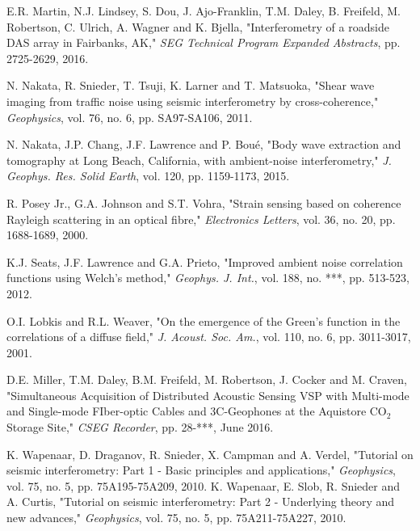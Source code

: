 \documentclass[11pt]{article}
\begin{document}
\begin{thebibliography}{30}
 E.R. Martin, N.J. Lindsey, S. Dou, J. Ajo-Franklin, T.M. Daley, B. Freifeld, M. Robertson, C. Ulrich, A. Wagner and K. Bjella, "Interferometry of a roadside DAS array in Fairbanks, AK," \textit{SEG Technical Program Expanded Abstracts}, pp. 2725-2629, 2016.


 N. Nakata, R. Snieder, T. Tsuji, K. Larner and T. Matsuoka, "Shear wave imaging from traffic noise using seismic interferometry by cross-coherence," \textit{Geophysics}, vol. 76, no. 6, pp. SA97-SA106, 2011.

 N. Nakata, J.P. Chang, J.F. Lawrence and P. Bou\'{e}, "Body wave extraction and tomography at Long Beach, California, with ambient-noise interferometry," \textit{J. Geophys. Res. Solid Earth}, vol. 120, pp. 1159-1173, 2015.

 R. Posey Jr., G.A. Johnson and S.T. Vohra, "Strain sensing based on coherence Rayleigh scattering in an optical fibre," \textit{Electronics Letters}, vol. 36, no. 20, pp. 1688-1689, 2000.

 K.J. Seats, J.F. Lawrence and G.A. Prieto, "Improved ambient noise correlation functions using Welch's method," \textit{Geophys. J. Int.}, vol. 188, no. ***, pp. 513-523, 2012.

 O.I. Lobkis and R.L. Weaver, "On the emergence of the Green's function in the correlations of a diffuse field," \textit{J. Acoust. Soc. Am.}, vol. 110, no. 6, pp. 3011-3017, 2001.

 D.E. Miller, T.M. Daley, B.M. Freifeld, M. Robertson, J. Cocker and M. Craven, "Simultaneous Acquisition of Distributed Acoustic Sensing VSP with Multi-mode and Single-mode FIber-optic Cables and 3C-Geophones at the Aquistore CO$_2$ Storage Site," \textit{CSEG Recorder}, pp. 28-***, June 2016.

 K. Wapenaar, D. Draganov, R. Snieder, X. Campman and A. Verdel, "Tutorial on seismic interferometry: Part 1 - Basic principles and applications," \textit{Geophysics}, vol. 75, no. 5, pp. 75A195-75A209, 2010.
 K. Wapenaar, E. Slob, R. Snieder and A. Curtis, "Tutorial on seismic interferometry: Part 2 - Underlying theory and new advances," \textit{Geophysics}, vol. 75, no. 5, pp. 75A211-75A227, 2010.


\end{thebibliography}
\end{document}
